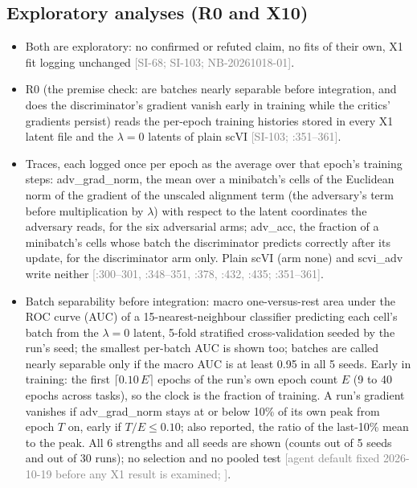 \documentclass[11pt]{article}
\newcommand{\src}[1]{{\scriptsize\textcolor{gray}{[#1]}}}
\begin{document}
\subsection{Exploratory analyses (R0 and X10)}
\begin{itemize}
\item Both are exploratory: no confirmed or refuted claim, no fits of their own, X1 fit logging unchanged \src{SI-68; SI-103; NB-20261018-01}.
\item R0 (the premise check: are batches nearly separable before integration, and does the discriminator's gradient vanish early in training while the critics' gradients persist) reads the per-epoch training histories stored in every X1 latent file and the $\lambda = 0$ latents of plain scVI \src{SI-103; :351--361}.
\item Traces, each logged once per epoch as the average over that epoch's training steps: adv\_grad\_norm, the mean over a minibatch's cells of the Euclidean norm of the gradient of the unscaled alignment term (the adversary's term before multiplication by $\lambda$) with respect to the latent coordinates the adversary reads, for the six adversarial arms; adv\_acc, the fraction of a minibatch's cells whose batch the discriminator predicts correctly after its update, for the discriminator arm only. Plain scVI (arm none) and scvi\_adv write neither \src{:300--301, :348--351, :378, :432, :435; \file{fit_paper_config.py}:351--361}.
\item Batch separability before integration: macro one-versus-rest area under the ROC curve (AUC) of a 15-nearest-neighbour classifier predicting each cell's batch from the $\lambda = 0$ latent, 5-fold stratified cross-validation seeded by the run's seed; the smallest per-batch AUC is shown too; batches are called nearly separable only if the macro AUC is at least 0.95 in all 5 seeds. Early in training: the first $\lceil 0.10\,E \rceil$ epochs of the run's own epoch count $E$ (9 to 40 epochs across tasks), so the clock is the fraction of training. A run's gradient vanishes if adv\_grad\_norm stays at or below 10\% of its own peak from epoch $T$ on, early if $T/E \leq 0.10$; also reported, the ratio of the last-10\% mean to the peak. All 6 strengths and all seeds are shown (counts out of 5 seeds and out of 30 runs); no selection and no pooled test \src{agent default fixed 2026-10-19 before any X1 result is examined; \file{paper/R0\_X10\_DEFAULTS.md}}.

\end{itemize}
\end{document}
